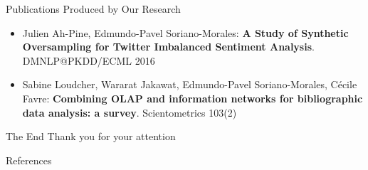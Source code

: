 \documentclass[10pt,xcolor=table]{beamer}
\begin{document}
\begin{frame}{Publications Produced by Our Research}
\begin{itemize}
	\item \small Julien Ah-Pine, Edmundo-Pavel Soriano-Morales: \textbf{A Study of Synthetic Oversampling for Twitter Imbalanced Sentiment Analysis}. DMNLP@PKDD/ECML 2016
	\item \small Sabine Loudcher, Wararat Jakawat, Edmundo-Pavel Soriano-Morales, Cécile Favre:
	\textbf{Combining OLAP and information networks for bibliographic data analysis: a survey}. Scientometrics 103(2)

\end{itemize}
\end{frame}	

%
\begin{frame}{The End}
\centering
\LARGE Thank you for your attention
\end{frame}

\begin{frame}[allowframebreaks]{References}

\printbibliography
%

\end{frame}	
	
\end{document}
